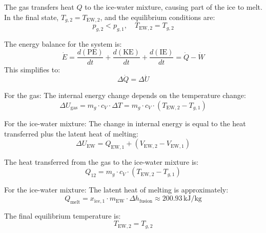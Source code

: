 The gas transfers heat \( Q \) to the ice-water mixture, causing part of the ice to melt. In the final state, \( T_{g,2} = T_{\text{EW},2} \), and the equilibrium conditions are:  
\[
p_{g,2} < p_{g,1}, \quad T_{\text{EW},2} = T_{g,2}
\]  

The energy balance for the system is:  
\[
\dot{E} = \frac{d(\text{PE})}{dt} + \frac{d(\text{KE})}{dt} + \frac{d(\text{IE})}{dt} = \dot{Q} - \dot{W}
\]  
This simplifies to:  
\[
\Delta \dot{Q} = \Delta \dot{U}
\]  

For the gas:  
The internal energy change depends on the temperature change:  
\[
\Delta U_{\text{gas}} = m_g \cdot c_V \cdot \Delta T = m_g \cdot c_V \cdot (T_{\text{EW},2} - T_{g,1})
\]  

For the ice-water mixture:  
The change in internal energy is equal to the heat transferred plus the latent heat of melting:  
\[
\Delta U_{\text{EW}} = Q_{\text{EW},1} + (V_{\text{EW},2} - V_{\text{EW},1})
\]  

The heat transferred from the gas to the ice-water mixture is:  
\[
Q_{12} = m_g \cdot c_V \cdot (T_{\text{EW},2} - T_{g,1})
\]  

For the ice-water mixture:  
The latent heat of melting is approximately:  
\[
Q_{\text{melt}} = x_{\text{ice},1} \cdot m_{\text{EW}} \cdot \Delta h_{\text{fusion}} \approx 200.93 \, \text{kJ/kg}
\]  

The final equilibrium temperature is:  
\[
T_{\text{EW},2} = T_{g,2}
\]